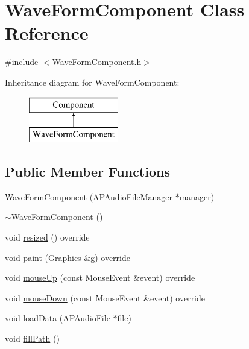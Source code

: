 \hypertarget{class_wave_form_component}{\section{Wave\+Form\+Component Class Reference}
\label{class_wave_form_component}
}


{\ttfamily \#include $<$Wave\+Form\+Component.\+h$>$}

Inheritance diagram for Wave\+Form\+Component\+:\begin{figure}[H]
\begin{center}
\leavevmode
\includegraphics[height=2.000000cm]{class_wave_form_component}
\end{center}
\end{figure}
\subsection*{Public Member Functions}
\begin{DoxyCompactItemize}
\item 
\hyperlink{class_wave_form_component_a82a7cc74bc5355a0a287019b7306ecb2}{Wave\+Form\+Component} (\hyperlink{class_a_p_audio_file_manager}{A\+P\+Audio\+File\+Manager} $\ast$manager)
\item 
\hyperlink{class_wave_form_component_af8b2d3204b7e518e8738f974db60240e}{$\sim$\+Wave\+Form\+Component} ()
\item 
void \hyperlink{class_wave_form_component_aeb89cdc66b68aa25b33a61573a795a0c}{resized} () override
\item 
void \hyperlink{class_wave_form_component_a5f6f4f882beed2521df679ae576404ba}{paint} (Graphics \&g) override
\item 
void \hyperlink{class_wave_form_component_a13a99b881a8062850441e60f819181d0}{mouse\+Up} (const Mouse\+Event \&event) override
\item 
void \hyperlink{class_wave_form_component_affa835711f93fa3f10298befa5c9d9bc}{mouse\+Down} (const Mouse\+Event \&event) override
\item 
void \hyperlink{class_wave_form_component_a67bdb7a7900e21224684e154c123bcce}{load\+Data} (\hyperlink{class_a_p_audio_file}{A\+P\+Audio\+File} $\ast$file)
\item 
void \hyperlink{class_wave_form_component_af1878b5bf08aff80f1ef0d8220d97081}{fill\+Path} ()
\end{DoxyCompactItemize}


